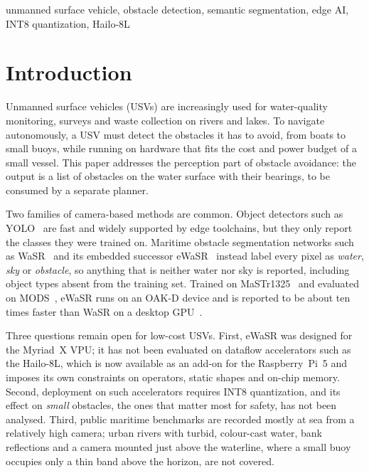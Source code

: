 \documentclass[conference]{IEEEtran}
\begin{document}
\begin{IEEEkeywords}
unmanned surface vehicle, obstacle detection, semantic segmentation, edge AI, INT8 quantization, Hailo-8L
\end{IEEEkeywords}

\section{Introduction}
Unmanned surface vehicles (USVs) are increasingly used for water-quality monitoring, surveys and waste collection on rivers and lakes. To navigate autonomously, a USV must detect the obstacles it has to avoid, from boats to small buoys, while running on hardware that fits the cost and power budget of a small vessel. This paper addresses the perception part of obstacle avoidance: the output is a list of obstacles on the water surface with their bearings, to be consumed by a separate planner.

Two families of camera-based methods are common. Object detectors such as YOLO~\cite{redmon2016yolo,jocher2023yolov8} are fast and widely supported by edge toolchains, but they only report the classes they were trained on. Maritime obstacle segmentation networks such as WaSR~\cite{bovcon2022wasr} and its embedded successor eWaSR~\cite{tersek2023ewasr} instead label every pixel as \emph{water}, \emph{sky} or \emph{obstacle}, so anything that is neither water nor sky is reported, including object types absent from the training set. Trained on MaSTr1325~\cite{bovcon2019mastr} and evaluated on MODS~\cite{bovcon2022mods}, eWaSR runs on an OAK-D device and is reported to be about ten times faster than WaSR on a desktop GPU~\cite{tersek2023ewasr}.

Three questions remain open for low-cost USVs. First, eWaSR was designed for the Myriad~X VPU; it has not been evaluated on dataflow accelerators such as the Hailo-8L, which is now available as an add-on for the Raspberry~Pi~5 and imposes its own constraints on operators, static shapes and on-chip memory. Second, deployment on such accelerators requires INT8 quantization, and its effect on \emph{small} obstacles, the ones that matter most for safety, has not been analysed. Third, public maritime benchmarks are recorded mostly at sea from a relatively high camera; urban rivers with turbid, colour-cast water, bank reflections and a camera mounted just above the waterline, where a small buoy occupies only a thin band above the horizon, are not covered.
\end{document}
